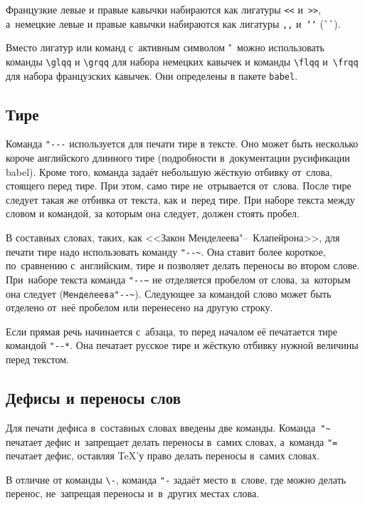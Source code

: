 Французкие левые и правые кавычки набираются
как лигатуры \verb|<<| и~\verb|>>|, а~немецкие левые
и правые кавычки набираются как лигатуры \verb|,,| и~\verb|‘‘| (\verb|``|).

Вместо лигатур или команд с~активным символом "\ можно использовать команды
\verb|\glqq| и \verb|\grqq| для набора немецких кавычек и команды \verb|\flqq|
и~\verb|\frqq| для набора французских кавычек. Они определены в пакете
\verb|babel|.

\subsection{Тире}
Команда \verb|"---| используется для печати тире в тексте. Оно может быть
несколько короче английского длинного тире (подробности в~документации
русификации babel). Кроме того, команда задаёт небольшую жёсткую отбивку
от~слова, стоящего перед тире. При этом, само тире не~отрывается от~слова.
После тире следует такая же отбивка от текста, как и~перед тире. При наборе
текста между словом и командой, за которым она следует, должен стоять пробел.

В составных словах, таких, как <<Закон Менделеева"--~Клапейрона>>, для печати
тире надо использовать команду \verb|"--~|. Она ставит более короткое,
по~сравнению с~английским, тире и позволяет делать переносы во втором слове.
При~наборе текста команда \verb|"--~| не отделяется пробелом от слова,
за~которым она следует (\verb|Менделеева"--~|). Следующее за командой слово
может быть  отделено от~неё пробелом или перенесено на другую строку.

Если прямая речь начинается с~абзаца, то перед началом её печатается тире
командой \verb|"--*|. Она печатает русское тире и жёсткую отбивку нужной
величины перед текстом.

\subsection{Дефисы и переносы слов}
Для печати дефиса в~составных словах введены две команды. Команда~\verb|"~|
печатает дефис и~запрещает делать переносы в~самих словах, а~команда \verb|"=|
печатает дефис, оставляя \TeX ’у право делать переносы в~самих словах.

В отличие от команды \verb|\-|, команда \verb|"-| задаёт место в~слове, где
можно делать перенос, не~запрещая переносы и~в~других местах слова.

